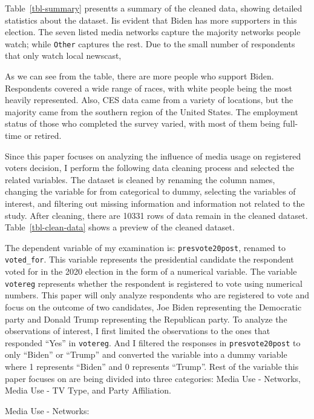 \documentclass[
  letterpaper,
  DIV=11,
  numbers=noendperiod]{scrartcl}
\begin{document}
Table~\ref{tbl-summary} presentts a summary of the cleaned data, showing
detailed statistics about the dataset. Iis evident that Biden has more
supporters in this election. The seven listed media networks capture the
majority networks people watch; while \texttt{Other} captures the rest.
Due to the small number of respondents that only watch local newscast,

As we can see from the table, there are more people who support Biden.
Respondents covered a wide range of races, with white people being the
most heavily represented. Also, CES data came from a variety of
locations, but the majority came from the southern region of the United
States. The employment status of those who completed the survey varied,
with most of them being full-time or retired.

Since this paper focuses on analyzing the influence of media usage on
registered voters decision, I perform the following data cleaning
process and selected the related variables. The dataset is cleaned by
renaming the column names, changing the variable for from categorical to
dummy, selecting the variables of interest, and filtering out missing
information and information not related to the study. After cleaning,
there are 10331 rows of data remain in the cleaned dataset.
Table~\ref{tbl-clean-data} shows a preview of the cleaned dataset.

The dependent variable of my examination is: \texttt{presvote20post},
renamed to \texttt{voted\_for}. This variable represents the
presidential candidate the respondent voted for in the 2020 election in
the form of a numerical variable. The variable \texttt{votereg}
represents whether the respondent is registered to vote using numerical
numbers. This paper will only analyze respondents who are registered to
vote and focus on the outcome of two candidates, Joe Biden representing
the Democratic party and Donald Trump representing the Republican party.
To analyze the observations of interest, I first limited the
observations to the ones that responded ``Yes'' in \texttt{votereg}. And
I filtered the responses in \texttt{presvote20post} to only ``Biden'' or
``Trump'' and converted the variable into a dummy variable where 1
represents ``Biden'' and 0 represents ``Trump''. Rest of the variable
this paper focuses on are being divided into three categories: Media Use
- Networks, Media Use - TV Type, and Party Affiliation.

Media Use - Networks:
\end{document}
